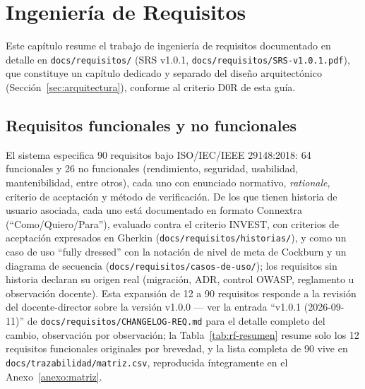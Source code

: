 \section{Ingeniería de Requisitos}
\label{sec:requisitos}

Este capítulo resume el trabajo de ingeniería de requisitos documentado en detalle en
\texttt{docs/requisitos/} (SRS v1.0.1, \texttt{docs/requisitos/SRS-v1.0.1.pdf}), que constituye un
capítulo dedicado y separado del diseño arquitectónico (Sección~\ref{sec:arquitectura}), conforme al
criterio D0R de esta guía.

\subsection{Requisitos funcionales y no funcionales}

El sistema especifica 90 requisitos bajo ISO/IEC/IEEE 29148:2018: 64 funcionales y 26 no funcionales
(rendimiento, seguridad, usabilidad, mantenibilidad, entre otros), cada uno con enunciado normativo,
\textit{rationale}, criterio de aceptación y método de verificación. De los que tienen historia de
usuario asociada, cada uno está documentado en formato Connextra (``Como/Quiero/Para''), evaluado contra
el criterio INVEST, con criterios de aceptación expresados en Gherkin
(\texttt{docs/requisitos/historias/}), y como un caso de uso ``fully dressed'' con la notación de nivel
de meta de Cockburn y un diagrama de secuencia (\texttt{docs/requisitos/casos-de-uso/}); los requisitos
sin historia declaran su origen real (migración, ADR, control OWASP, reglamento u observación docente).
Esta expansión de 12 a 90 requisitos responde a la revisión del docente-director sobre la versión
v1.0.0 --- ver la entrada ``v1.0.1 (2026-09-11)'' de \texttt{docs/requisitos/CHANGELOG-REQ.md} para el
detalle completo del cambio, observación por observación; la Tabla~\ref{tab:rf-resumen} resume solo los
12 requisitos funcionales originales por brevedad, y la lista completa de 90 vive en
\texttt{docs/trazabilidad/matriz.csv}, reproducida íntegramente en el Anexo~\ref{anexo:matriz}.

